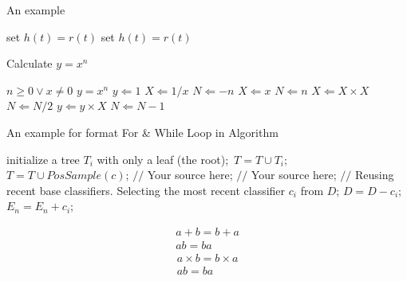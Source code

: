 \documentclass[12pt]{article}
\begin{document}
\begin{algorithm}
    \caption{An example}
    \label{alg:2}
    \begin{algorithmic}
        \REPEAT
        \STATE set $h(t)=r(t)$
        \REPEAT
        \STATE set $h(t)=r(t)$
    \end{algorithmic}
\end{algorithm}
\begin{algorithm}
    \caption{Calculate $y = x^n$}
    \label{alg:3}
    \begin{algorithmic}
        \REQUIRE $n \geq 0 \vee x \neq 0$
        \ENSURE $y = x^n$
        \STATE $y \Leftarrow 1$
        \STATE $X \Leftarrow 1 / x$
        \STATE $N \Leftarrow -n$
    \ELSE
        \STATE $X \Leftarrow x$
        \STATE $N \Leftarrow n$
    \ENDIF
            \STATE $X \Leftarrow X \times X$
            \STATE $N \Leftarrow N / 2$
        \ELSE[$N$ is odd]
            \STATE $y \Leftarrow y \times X$
            \STATE $N \Leftarrow N - 1$
        \ENDIF
    \ENDWHILE
    \end{algorithmic}
\end{algorithm}
\begin{algorithm}[h]
    \caption{An example for format For \& While Loop in Algorithm}
    \label{alg:4}
    \begin{algorithmic}[1]
            \STATE initialize a tree $T_{i}$ with only a leaf (the root);\
            \STATE $T=T \cup T_{i};$\
        \ENDFOR
            \STATE $T=T \cup PosSample(c)$;
        \ENDFOR
            \STATE $//$ Your source here;
        \ENDFOR
            \STATE $//$ Your source here;
        \ENDFOR
            \STATE $//$ Reusing recent base classifiers.
            \STATE Selecting the most recent classifier $c_i$ from $D$;
            \STATE $D=D-c_i$;
            \STATE $E_n=E_n+c_i$;
        \ENDWHILE
    \end{algorithmic}
\end{algorithm}
\clearpage
\begin{gather}%
	a+b=b+a\\
	ab=ba
\end{gather}
\begin{gather*}%
a \times b=b \times a\\
ab=ba   
\end{gather*}
\end{document}
